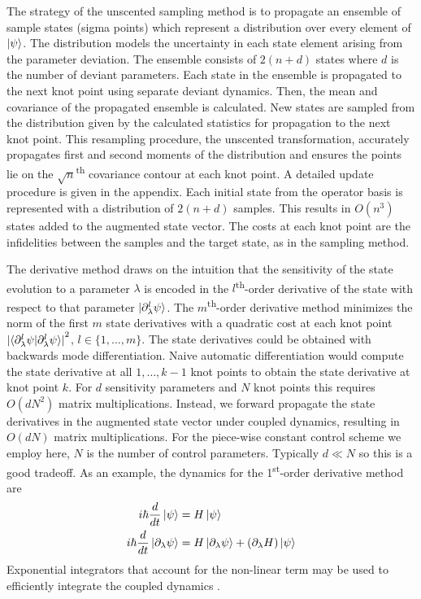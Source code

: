 \documentclass[
  amsfonts,
  amsmath,
  tbtags,
  amssymb,
  aps,
  nobibnotes,
  twocolumn,
  superscriptaddress,
]{revtex4-2}
\begin{document}
The strategy of the unscented sampling method is to
propagate an ensemble of sample states (sigma points) which represent a distribution
over every element of $\ket{\psi}$. The distribution
models the uncertainty in each state element arising from the
parameter deviation. The ensemble consists of $2 (n + d)$ states
where $d$ is the number of deviant parameters. Each state in the
ensemble is propagated to the next
knot point using separate deviant dynamics. Then, the mean and covariance of
the propagated ensemble is calculated. New states are sampled from the distribution
given by the calculated statistics for propagation to the next knot point.
This resampling procedure, the unscented transformation, accurately propagates
first and second moments of the distribution and ensures the points
lie on the $\sqrt{n}$\textsuperscript{th}
covariance contour at each knot point. A detailed update procedure is given
in the appendix. Each initial state from the operator basis
is represented with a distribution of $2 (n + d)$ samples. This results
in $O(n^{3})$ states added to the augmented state vector.
The costs at each knot point are the infidelities between the samples
and the target state, as in the sampling method.

The derivative method draws on the intuition that
the sensitivity of the state evolution to a parameter
$\lambda$ is encoded in the $l$\textsuperscript{th}-order
derivative of the state with respect to that parameter
$\ket{\partial_{\lambda}^{l} \psi}$. The $m$\textsuperscript{th}-order
derivative method minimizes the norm of the first $m$
state derivatives with a quadratic cost at each knot point
${\lvert \braket{\partial^{l}_{\lambda} \psi | \partial^{l}_{\lambda} \psi}
  \rvert}^{2}$, $l \in \{1, \dots, m\}$.
The state derivatives could be obtained with backwards mode differentiation.
Naive automatic differentiation would compute
the state derivative at all $1, \dots, k - 1$ knot points
to obtain the state derivative at knot point $k$.
For $d$ sensitivity parameters and $N$ knot points
this requires $O(d N^2)$ matrix multiplications. Instead,
we forward propagate the state derivatives in the
augmented state vector under coupled dynamics, resulting
in $O(d N)$ matrix multiplications. For the piece-wise constant control
scheme we employ here, $N$ is the number of control parameters. Typically
$d \ll N$ so this is a good tradeoff. As an example, the dynamics
for the 1\textsuperscript{st}-order derivative method are
\begin{align}
  i \hbar \frac{d}{dt} \ket{\psi} &= H \ket{\psi}\\
  i \hbar \frac{d}{dt} \ket{\partial_{\lambda}\psi} &=
  H \ket{\partial_{\lambda} \psi} +
  (\partial_{\lambda} H) \ket{\psi}
\end{align}
Exponential integrators that account for the non-linear
term may be used to efficiently integrate the coupled dynamics
\cite{berland2005solving, einkemmer2017performance}.
\end{document}
